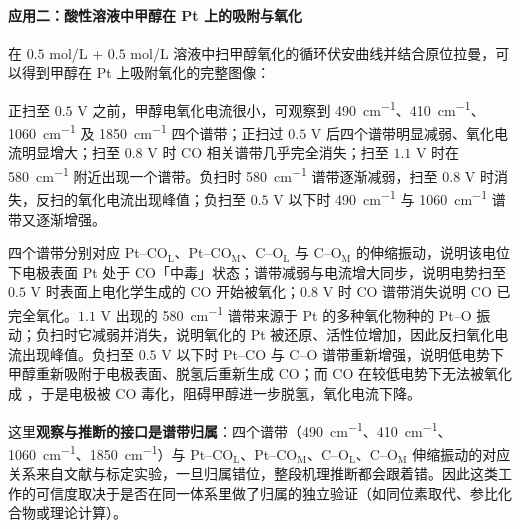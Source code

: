 \paragraph{应用二：酸性溶液中甲醇在 Pt 上的吸附与氧化}
在 $0.5$ mol/L  + $0.5$ mol/L  溶液中扫甲醇氧化的循环伏安曲线并结合原位拉曼，可以得到甲醇在 Pt 上吸附氧化的完整图像：
\begin{obs}
 正扫至 $0.5$ V 之前，甲醇电氧化电流很小，可观察到 \qty{490}{cm^{-1}}、\qty{410}{cm^{-1}}、\qty{1060}{cm^{-1}} 及 \qty{1850}{cm^{-1}} 四个谱带；正扫过 $0.5$ V 后四个谱带明显减弱、氧化电流明显增大；扫至 $0.8$ V 时 CO 相关谱带几乎完全消失；扫至 $1.1$ V 时在 \qty{580}{cm^{-1}} 附近出现一个谱带。负扫时 \qty{580}{cm^{-1}} 谱带逐渐减弱，扫至 $0.8$ V 时消失，反扫的氧化电流出现峰值；负扫至 $0.5$ V 以下时 \qty{490}{cm^{-1}} 与 \qty{1060}{cm^{-1}} 谱带又逐渐增强。
\end{obs}
\begin{infer}
 四个谱带分别对应 Pt--CO$_{\mathrm{L}}$、Pt--CO$_{\mathrm{M}}$、C--O$_{\mathrm{L}}$ 与 C--O$_{\mathrm{M}}$ 的伸缩振动，说明该电位下电极表面 Pt 处于 CO「中毒」状态；谱带减弱与电流增大同步，说明电势扫至 $0.5$ V 时表面上电化学生成的 CO 开始被氧化；$0.8$ V 时 CO 谱带消失说明 CO 已完全氧化。$1.1$ V 出现的 \qty{580}{cm^{-1}} 谱带来源于 Pt 的多种氧化物种的 Pt--O 振动；负扫时它减弱并消失，说明氧化的 Pt 被还原、活性位增加，因此反扫氧化电流出现峰值。负扫至 $0.5$ V 以下时 Pt--CO 与 C--O 谱带重新增强，说明低电势下甲醇重新吸附于电极表面、脱氢后重新生成 CO；而 CO 在较低电势下无法被氧化成 ，于是电极被 CO 毒化，阻碍甲醇进一步脱氢，氧化电流下降。
\end{infer}
这里\textbf{观察与推断的接口是谱带归属}：四个谱带（\qty{490}{cm^{-1}}、\qty{410}{cm^{-1}}、\qty{1060}{cm^{-1}}、\qty{1850}{cm^{-1}}）与 Pt--CO$_{\mathrm{L}}$、Pt--CO$_{\mathrm{M}}$、C--O$_{\mathrm{L}}$、C--O$_{\mathrm{M}}$ 伸缩振动的对应关系来自文献与标定实验，一旦归属错位，整段机理推断都会跟着错。因此这类工作的可信度取决于是否在同一体系里做了归属的独立验证（如同位素取代、参比化合物或理论计算）。

